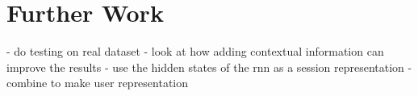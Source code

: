 \chapter{Further Work}

- do testing on real dataset
- look at how adding contextual information can improve the results
- use the hidden states of the rnn as a session representation
   - combine to make user representation

